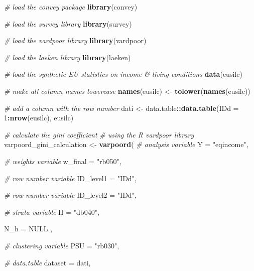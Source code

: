 \documentclass[
]{book}
\newenvironment{Shaded}{\begin{snugshade}}{\end{snugshade}}
\newcommand{\AttributeTok}[1]{\textcolor[rgb]{0.13,0.29,0.53}{#1}}
\newcommand{\CommentTok}[1]{\textcolor[rgb]{0.56,0.35,0.01}{\textit{#1}}}
\newcommand{\ConstantTok}[1]{\textcolor[rgb]{0.56,0.35,0.01}{#1}}
\newcommand{\DecValTok}[1]{\textcolor[rgb]{0.00,0.00,0.81}{#1}}
\newcommand{\FunctionTok}[1]{\textcolor[rgb]{0.13,0.29,0.53}{\textbf{#1}}}
\newcommand{\NormalTok}[1]{#1}
\newcommand{\OtherTok}[1]{\textcolor[rgb]{0.56,0.35,0.01}{#1}}
\newcommand{\SpecialCharTok}[1]{\textcolor[rgb]{0.81,0.36,0.00}{\textbf{#1}}}
\newcommand{\StringTok}[1]{\textcolor[rgb]{0.31,0.60,0.02}{#1}}
\begin{document}
\begin{Shaded}
\begin{Highlighting}[]
\CommentTok{\# load the convey package}
\FunctionTok{library}\NormalTok{(convey)}

\CommentTok{\# load the survey library}
\FunctionTok{library}\NormalTok{(survey)}

\CommentTok{\# load the vardpoor library}
\FunctionTok{library}\NormalTok{(vardpoor)}

\CommentTok{\# load the laeken library}
\FunctionTok{library}\NormalTok{(laeken)}

\CommentTok{\# load the synthetic EU statistics on income \& living conditions}
\FunctionTok{data}\NormalTok{(eusilc)}

\CommentTok{\# make all column names lowercase}
\FunctionTok{names}\NormalTok{(eusilc) }\OtherTok{\textless{}{-}} \FunctionTok{tolower}\NormalTok{(}\FunctionTok{names}\NormalTok{(eusilc))}

\CommentTok{\# add a column with the row number}
\NormalTok{dati }\OtherTok{\textless{}{-}}\NormalTok{ data.table}\SpecialCharTok{::}\FunctionTok{data.table}\NormalTok{(}\AttributeTok{IDd =} \DecValTok{1}\SpecialCharTok{:}\FunctionTok{nrow}\NormalTok{(eusilc), eusilc)}

\CommentTok{\# calculate the gini coefficient}
\CommentTok{\# using the R vardpoor library}
\NormalTok{varpoord\_gini\_calculation }\OtherTok{\textless{}{-}}
  \FunctionTok{varpoord}\NormalTok{(}
    \CommentTok{\# analysis variable}
    \AttributeTok{Y =} \StringTok{"eqincome"}\NormalTok{,}
    
    \CommentTok{\# weights variable}
    \AttributeTok{w\_final =} \StringTok{"rb050"}\NormalTok{,}
    
    \CommentTok{\# row number variable}
    \AttributeTok{ID\_level1 =} \StringTok{"IDd"}\NormalTok{,}
    
    \CommentTok{\# row number variable}
    \AttributeTok{ID\_level2 =} \StringTok{"IDd"}\NormalTok{,}
    
    \CommentTok{\# strata variable}
    \AttributeTok{H =} \StringTok{"db040"}\NormalTok{,}
    
    \AttributeTok{N\_h =} \ConstantTok{NULL}\NormalTok{ ,}
    
    \CommentTok{\# clustering variable}
    \AttributeTok{PSU =} \StringTok{"rb030"}\NormalTok{,}
    
    \CommentTok{\# data.table}
    \AttributeTok{dataset =}\NormalTok{ dati,}
    

\end{Highlighting}
\end{Shaded}
\end{document}

